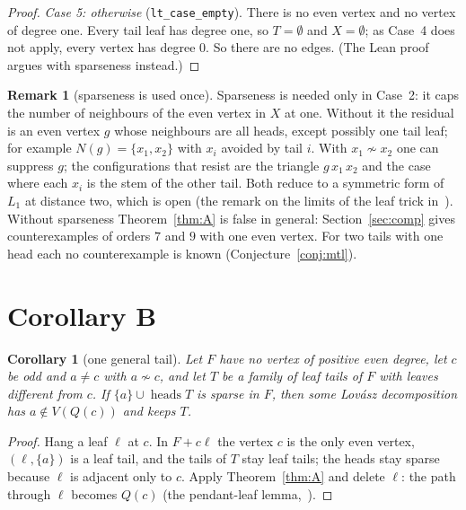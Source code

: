 \documentclass[11pt]{amsart}
\newtheorem{corollary}[theorem]{Corollary}
\theoremstyle{definition}
\newtheorem{remark}[theorem]{Remark}
\newcommand{\lean}[1]{\quad{\footnotesize[Lean: \texttt{#1}]}}
\newcommand{\heads}{\operatorname{heads}}
\begin{document}
\begin{proof}
\emph{Case 5: otherwise} (\texttt{lt\_case\_empty}). There is no even vertex and no vertex of degree
one. Every tail leaf has degree one, so $T=\emptyset$ and $X=\emptyset$; as Case~4 does not apply,
every vertex has degree $0$. So there are no edges. (The Lean proof argues with sparseness instead.)
\end{proof}

\begin{remark}[sparseness is used once]\label{rem:sparse}
Sparseness is needed only in Case~2: it caps the number of neighbours of the even vertex in $X$ at
one. Without it the residual is an even vertex $g$ whose neighbours are all heads, except possibly
one tail leaf; for example
$N(g)=\{x_1,x_2\}$ with $x_i$ avoided by tail $i$. With $x_1\not\sim x_2$ one can suppress $g$; the
configurations that resist are the triangle $g\,x_1\,x_2$ and the case where each $x_i$ is the stem
of the other tail. Both reduce to a symmetric form of $L_1$ at distance two, which is open
(the remark on the limits of the leaf trick in~\cite{RD}). Without sparseness Theorem~\ref{thm:A}
is false in general: Section~\ref{sec:comp} gives counterexamples of orders $7$ and $9$ with one even
vertex. For two tails with one head each no counterexample is known (Conjecture~\ref{conj:mtl}).
\end{remark}

\section{Corollary B}\label{sec:B}

\begin{corollary}[one general tail]\label{cor:B}
Let $F$ have no vertex of positive even degree, let $c$ be odd and $a\ne c$ with $a\not\sim c$, and
let $T$ be a family of leaf tails of $F$ with leaves different from $c$. If $\{a\}\cup\heads T$ is
sparse in $F$, then some Lov\'asz decomposition has $a\notin V(Q(c))$ and keeps $T$.
\lean{lovasz\_avoid\_leafTails}
\end{corollary}

\begin{proof}
Hang a leaf $\ell$ at $c$. In $F+c\ell$ the vertex $c$ is the only even vertex, $(\ell,\{a\})$ is a
leaf tail, and the tails of $T$ stay leaf tails; the heads stay sparse because $\ell$ is adjacent
only to $c$. Apply Theorem~\ref{thm:A} and delete $\ell$: the path through $\ell$ becomes $Q(c)$
(the pendant-leaf lemma,~\cite[Lemma~2.3]{NA}).
\end{proof}
\end{document}
